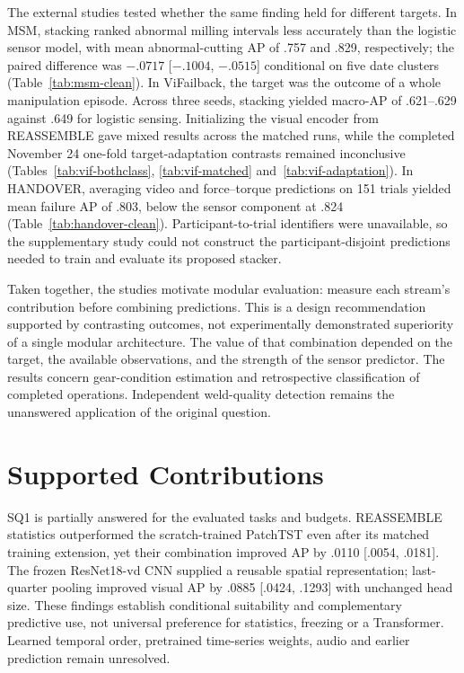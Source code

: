 The external studies tested whether the same finding held for different targets. In MSM, stacking ranked abnormal milling intervals less accurately than the logistic sensor model, with mean abnormal-cutting AP of .757 and .829, respectively; the paired difference was $-.0717$ [$-.1004$, $-.0515$] conditional on five date clusters (Table~\ref{tab:msm-clean}). In ViFailback, the target was the outcome of a whole manipulation episode. Across three seeds, stacking yielded macro-AP of .621--.629 against .649 for logistic sensing. Initializing the visual encoder from REASSEMBLE gave mixed results across the matched runs, while the completed November 24 one-fold target-adaptation contrasts remained inconclusive (Tables~\ref{tab:vif-bothclass}, \ref{tab:vif-matched} and~\ref{tab:vif-adaptation}). In HANDOVER, averaging video and force--torque predictions on 151 trials yielded mean failure AP of .803, below the sensor component at .824 (Table~\ref{tab:handover-clean}). Participant-to-trial identifiers were unavailable, so the supplementary study could not construct the participant-disjoint predictions needed to train and evaluate its proposed stacker.

Taken together, the studies motivate modular evaluation: measure each stream's contribution before combining predictions. This is a design recommendation supported by contrasting outcomes, not experimentally demonstrated superiority of a single modular architecture. The value of that combination depended on the target, the available observations, and the strength of the sensor predictor. The results concern gear-condition estimation and retrospective classification of completed operations. Independent weld-quality detection remains the unanswered application of the original question.

\section{Supported Contributions}
SQ1 is partially answered for the evaluated tasks and budgets. REASSEMBLE statistics outperformed the scratch-trained PatchTST even after its matched training extension, yet their combination improved AP by .0110 [.0054, .0181]. The frozen ResNet18-vd CNN supplied a reusable spatial representation; last-quarter pooling improved visual AP by .0885 [.0424, .1293] with unchanged head size. These findings establish conditional suitability and complementary predictive use, not universal preference for statistics, freezing or a Transformer. Learned temporal order, pretrained time-series weights, audio and earlier prediction remain unresolved.

